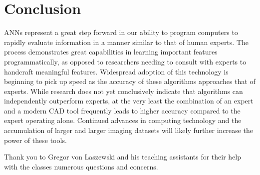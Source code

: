 \documentclass[sigconf]{acmart}
\begin{document}
\section{Conclusion}

ANNs represent a great step forward in our ability to program computers to rapidly evaluate information in a manner similar to that of human experts. The process demonstrates great capabilities in learning important features programmatically, as opposed to researchers needing to consult with experts to handcraft meaningful features. Widespread adoption of this technology is beginning to pick up speed as the accuracy of these algorithms approaches that of experts. While research does not yet conclusively indicate that algorithms can independently outperform experts, at the very least the combination of an expert and a modern CAD tool frequently leads to higher accuracy compared to the expert operating alone. Continued advances in computing technology and the accumulation of larger and larger imaging datasets will likely further increase the power of these tools.

\begin{acks}

Thank you to Gregor von Laszewski and his teaching assistants for their help with the classes numerous questions and concerns.
  
\end{acks}


 

\appendix
 

\end{document}
